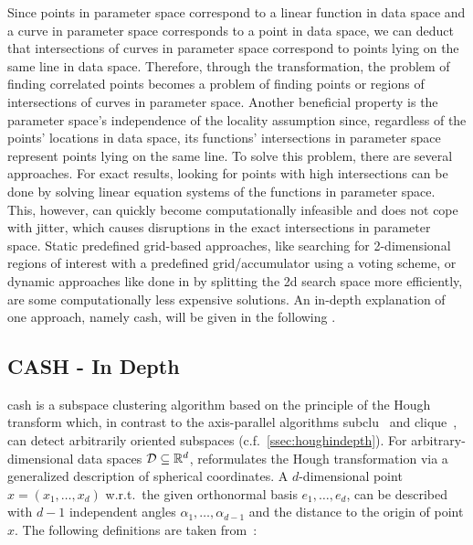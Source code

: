 Since points in parameter space correspond to a linear function in data space and a curve in parameter space corresponds to a point in data space, we can deduct that intersections of curves in parameter space correspond to points lying on the same line in data space. 
Therefore, through the transformation, the problem of finding correlated points becomes a problem of finding points or regions of intersections of curves in parameter space. 
Another beneficial property is the parameter space's independence of the locality assumption since, regardless of the points' locations in data space, its functions' intersections in parameter space represent points lying on the same line.  
To solve this problem, there are several approaches. 
For exact results, looking for points with high intersections can be done by solving linear equation systems of the functions in parameter space. 
This, however, can quickly become computationally infeasible and does not cope with jitter, which causes disruptions in the exact intersections in parameter space. 
Static predefined grid-based approaches, like searching for 2-dimensional regions of interest with a predefined grid/accumulator using a voting scheme, or dynamic approaches like done in \citeauthor{CASHachtert2008global} by splitting the 2d search space more efficiently, are some computationally less expensive solutions. 
An in-depth explanation of one approach, namely \acrfull{cash}, will be given in the following .

\subsection{CASH - In Depth}\label{ssec:CASHindepth}
\acrfull{cash} is a subspace clustering algorithm based on the principle of the Hough transform which, in contrast to the axis-parallel algorithms \acrshort{subclu}~\cite{sublcukailing2004density} and \acrshort{clique}~\cite{cliqueagrawal1998automatic}, can detect arbitrarily oriented subspaces (c.f.~\autoref{ssec:houghindepth}). 
For arbitrary-dimensional data spaces $\mathcal{D} \subseteq \mathbb{R}^d$, \citeauthor{CASHachtert2008robust} reformulates the Hough transformation via a generalized description of spherical coordinates. A $d$-dimensional point $x=(x_1,\dotsc,x_d)$ w.r.t.\ the given orthonormal basis $e_1,\dotsc,e_d$, can be described with $d-1$ independent angles $\alpha_1,\dotsc,\alpha_{d-1}$ and the distance to the origin of point $x$. The following definitions are taken from~\cite{CASHachtert2008robust}:


